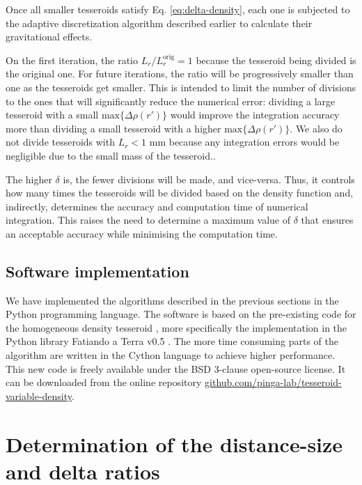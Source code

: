 \documentclass[extra]{gji}
\begin{document}
Once all smaller tesseroids satisfy Eq. \ref{eq:delta-density},
each one is subjected to the adaptive
discretization algorithm described earlier to calculate their gravitational effects.

On the first iteration, the ratio $L_r/L_r^\text{orig} = 1$ because the tesseroid being
divided is the original one.
For future iterations, the ratio will be progressively smaller than one as the
tesseroids get smaller.
This is intended to limit the number of divisions to the ones that will
significantly reduce the numerical error:
dividing a large tesseroid with a small $\text{max}\{ \Delta \rho(r') \}$ would
improve the integration accuracy more than dividing a small tesseroid with a
higher $\text{max}\{ \Delta \rho(r') \}$.
We also do not divide tesseroids with $L_r < 1$ mm because any integration errors would
be negligible due to the small mass of the tesseroid..

The higher $\delta$ is, the fewer divisions will be made, and vice-versa.
Thus, it controls how many times the tesseroids will be divided based on the density
function and, indirectly, determines the accuracy and computation time of
numerical integration.
This raises the need to determine a maximum value of $\delta$ that
ensures an acceptable accuracy while minimising the computation time.


\subsection{Software implementation}

We have implemented the algorithms described in the previous sections in the Python
programming language.
The software is based on the pre-existing code for the homogeneous density tesseroid
\citep{Uieda2016}, more specifically the implementation in the Python library Fatiando a
Terra v0.5 \citep{Uieda2013}.
The more time consuming parts of the algorithm are written in the Cython language to
achieve higher performance.
This new code is freely available under the BSD 3-clause open-source license.
It can be downloaded from the online repository
\href{https://github.com/pinga-lab/tesseroid-variable-density}{github.com/pinga-lab/tesseroid-variable-density}.




\section{Determination of the distance-size and delta ratios}
\end{document}
